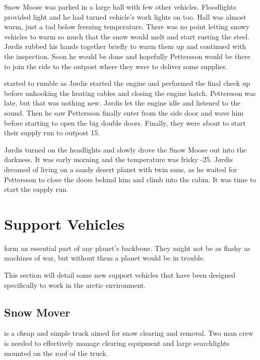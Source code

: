 \documentclass{tufte-book}
\begin{document}
Snow Moose was parked in a large hall with few other vehicles.
Floodlights provided light and he had turned vehicle's work lights on
too. Hall was almost warm, just a tad below freezing temperature.
There was no point letting snowy vehicles to warm so much that the
snow would melt and start rusting the steel. J\o rdis rubbed his hands
together briefly to warm them up and continued with the inspection.
Soon he would be done and hopefully Pettersson would be there to
join the ride to the outpost where they were to deliver some
supplies.

 started to rumble as J\o rdis started the
engine and performed the final check up before unhooking the heating
cables and closing the engine hatch. Pettersson was late, but that was
nothing new. J\o rdis let the engine idle and listened to the sound.
Then he saw Pettersson finally enter from the side door and wave him
before starting to open the big double doors. Finally, they were about
to start their supply run to outpost 15.

J\o rdis turned on the headlights and slowly drove the Snow Moose out
into the darkness. It was early morning and the temperature was frisky
-25\celsius. J\o rdis dreamed of living on a sandy desert planet with
twin suns, as he waited for Pettersson to close the doors behind him 
and climb into the cabin. It was time to start the supply run.

\clearpage

\chapter{Support Vehicles}
\label{ch:support-vehicles}


 form an essential part of any planet's
backbone. They might not be as flashy as machines of war, but without
them a planet would be in trouble.

This section will detail some new support vehicles that have been
designed specifically to work in the arctic environment.

\clearpage

\section{Snow Mover}
 is a cheap and simple truck aimed for snow clearing and
removal. Two man crew is needed to effectively manage clearing equipment
and large searchlights mounted on the roof of the truck.
\end{document}
